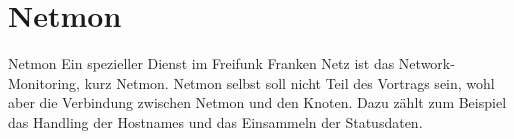 \section{Netmon}

\begin{frame}{Netmon}
Ein spezieller Dienst im Freifunk Franken Netz ist das
Network-Monitoring, kurz Netmon. Netmon selbst soll nicht Teil des
Vortrags sein, wohl aber die Verbindung zwischen Netmon und den
Knoten. Dazu zählt zum Beispiel das Handling der Hostnames und das
Einsammeln der Statusdaten.
\end{frame}
